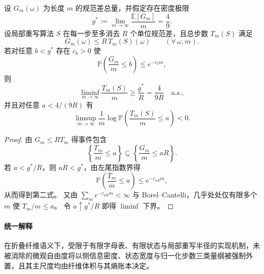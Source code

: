 \begin{theorem}[局部归一化步数的线性下界与指数左尾]\label{thm:xi-time-part9f-local-normalization-step-lower-bound}
设 \(G_m(\omega)\) 为长度 \(m\) 的规范差总量，并假定存在密度极限
\[
g^{\ast}:=\lim_{m\to\infty}\frac{\mathbb E[G_m]}{m}=\frac49.
\]
设局部重写算法 \(S\) 在每一步至多消去 \(R\) 个单位规范差，且总步数 \(T_m(S)\) 满足
\[
G_m(\omega)\le R\,T_m(S)(\omega)\qquad(\forall\,\omega,m).
\]
若对任意 \(b<g^{\ast}\) 存在 \(c_b>0\) 使
\[
\mathbb P\!\left(\frac{G_m}{m}\le b\right)\le e^{-c_b m},
\]
则
\[
\liminf_{m\to\infty}\frac{T_m(S)}{m}\ge \frac{g^{\ast}}{R}
=\frac{4}{9R}
\quad\text{a.s.},
\]
并且对任意 \(a<4/(9R)\) 有
\[
\limsup_{m\to\infty}\frac1m\log
\mathbb P\!\left(\frac{T_m(S)}{m}\le a\right)<0.
\]
\end{theorem}
\begin{proof}
由 \(G_m\le RT_m\) 得事件包含
\[
\left\{\frac{T_m}{m}\le a\right\}\subseteq
\left\{\frac{G_m}{m}\le aR\right\}.
\]
若 \(a<g^{\ast}/R\)，则 \(aR<g^{\ast}\)，由左尾指数界得
\[
\mathbb P\!\left(\frac{T_m}{m}\le a\right)\le e^{-c_{aR}m},
\]
从而得到第二式。
又由 \(\sum_m e^{-c_{aR}m}<\infty\) 与 Borel--Cantelli，几乎处处仅有限多个 \(m\) 使 \(T_m/m\le a\)。
令 \(a\uparrow g^{\ast}/R\) 即得 \(\liminf\) 下界。
\end{proof}

\paragraph{统一解释}
在折叠纤维语义下，受限于有限字母表、有限状态与局部重写半径的实现机制，未被消除的微观自由度将以侧信息密度、状态宽度与归一化步数三类量纲被强制外置，且其主尺度均由纤维体积与其熵账本决定。
